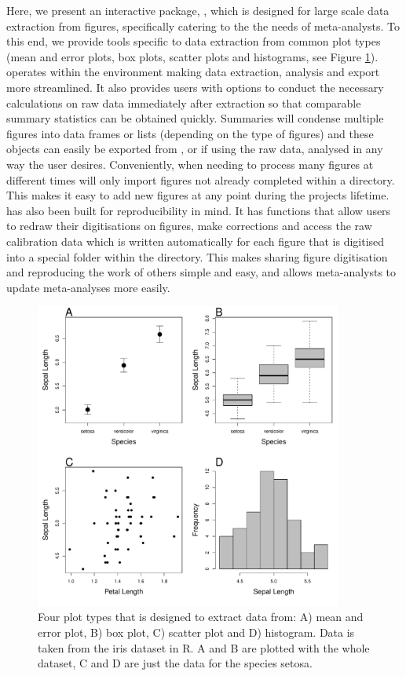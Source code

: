 \documentclass[article]{jss}
\begin{document}
Here, we present an interactive  package, , which is designed for large scale data extraction from figures, specifically catering to the the needs of meta-analysts. To this end, we provide tools specific to data extraction from common plot types (mean and error plots, box plots, scatter plots and histograms, see Figure \ref{fig:plot_type}).  operates within the  environment making data extraction, analysis and export more streamlined. It also provides users with options to conduct the necessary calculations on raw data immediately after extraction so that comparable summary statistics can be obtained quickly. Summaries will condense multiple figures into data frames or lists (depending on the type of figures) and these objects can easily be exported from , or if using the raw data, analysed in any way the user desires. Conveniently, when needing to process many figures at different times  will only import figures not already completed within a directory. This makes it easy to add new figures at any point during the projects lifetime.  has also been built for reproducibility in mind. It has functions that allow users to redraw their digitisations on figures, make corrections and access the raw calibration data which is written automatically for each figure that is digitised into a special folder within the directory. This makes sharing figure digitisation and reproducing the work of others simple and easy, and allows meta-analysts to update meta-analyses more easily.


\begin{figure}[b!] 
 \includegraphics[width=0.9\textwidth]{fig_plot_type.pdf} 
 \caption{Four plot types that  is designed to extract data from: A) mean and error plot, B) box plot, C) scatter plot and D) histogram. Data is taken from the iris dataset in R. A and B are plotted with the whole dataset, C and D are just the data for the species setosa.}
\label{fig:plot_type}
\end{figure}
\end{document}
